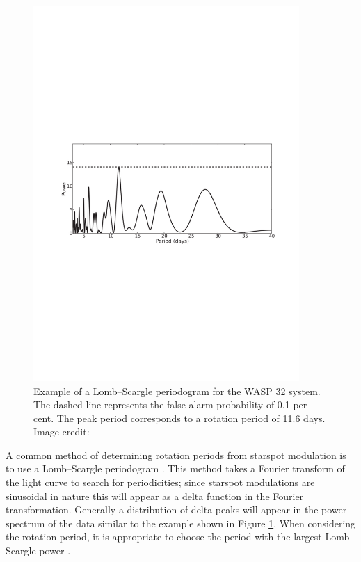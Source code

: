 \begin{figure}
    \centering
    \includegraphics[width=0.9\textwidth]{Figures/1-Introduction/brothwell_2014_LSP.pdf}
    \caption[Lomb Scargle periodogram example]{Example of a Lomb--Scargle periodogram for the WASP 32 system. The dashed line represents the false alarm probability of 0.1 per cent. The peak period corresponds to a rotation period of 11.6 days. Image credit: \citet{Brothwell_etal_2014}}
    \label{fig:LS_periodogram_example}
\end{figure}

A common method of determining rotation periods from starspot modulation is to use a Lomb--Scargle periodogram \citep{Lomb_1976,Scargle_1982}. This method takes a Fourier transform of the light curve to search for periodicities; since starspot modulations are sinusoidal in nature this will appear as a delta function in the Fourier transformation. Generally a distribution of delta peaks will appear in the power spectrum of the data similar to the example shown in Figure \ref{fig:LS_periodogram_example}. When considering the rotation period, it is appropriate to choose the period with the largest Lomb Scargle power \citep{Nielsen_Karoff_2012}.

